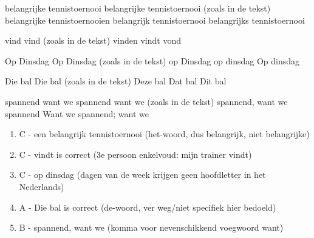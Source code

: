 \begin{opgave}
\begin{vragen}
%
{belangrijke tennistoernooi}%
{belangrijke tennistoernooi (zoals in de tekst)}%
{belangrijke tennistoernooien}%
{belangrijk tennistoernooi}%
{belangrijks tennistoernooi}

%
{vind}%
{vind (zoals in de tekst)}%
{vinden}%
{vindt}%
{vond}

%
{Op Dinsdag}%
{Op Dinsdag (zoals in de tekst)}%
{op Dinsdag}%
{op dinsdag}%
{Op dinsdag}

%
{Die bal}%
{Die bal (zoals in de tekst)}%
{Deze bal}%
{Dat bal}%
{Dit bal}

%
{spannend want we}%
{spannend want we (zoals in de tekst)}%
{spannend, want we}%
{spannend Want we}%
{spannend; want we}
\end{vragen}

\end{opgave}

\begin{oplossing}
\begin{enumerate}
\item C - een belangrijk tennistoernooi (het-woord, dus belangrijk, niet
belangrijke)
\item C - vindt is correct (3e persoon enkelvoud: mijn trainer vindt)
\item C - op dinsdag (dagen van de week krijgen geen hoofdletter in het
Nederlands)
\item A - Die bal is correct (de-woord, ver weg/niet specifiek hier bedoeld)
\item B - spannend, want we (komma voor nevenschikkend voegwoord want)
\end{enumerate}
\end{oplossing}

